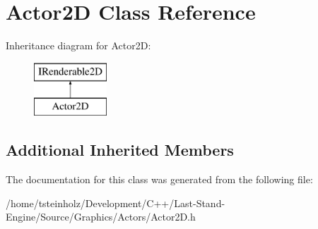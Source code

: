 \hypertarget{classActor2D}{}\section{Actor2\+D Class Reference}
\label{classActor2D}
Inheritance diagram for Actor2\+D\+:\begin{figure}[H]
\begin{center}
\leavevmode
\includegraphics[height=2.000000cm]{classActor2D}
\end{center}
\end{figure}
\subsection*{Additional Inherited Members}


The documentation for this class was generated from the following file\+:\begin{DoxyCompactItemize}
\item 
/home/tsteinholz/\+Development/\+C++/\+Last-\/\+Stand-\/\+Engine/\+Source/\+Graphics/\+Actors/Actor2\+D.\+h\end{DoxyCompactItemize}
